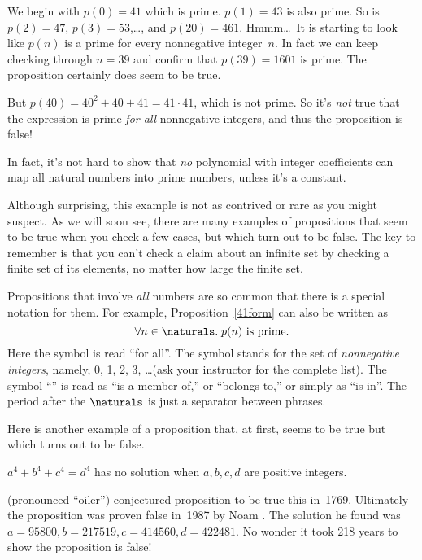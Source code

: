 We begin with $p(0) = 41$ which is prime.  $p(1) = 43$ is also prime.
So is $p(2) = 47$, $p(3)=53$,\dots, and $p(20) = 461$.  Hmmm\dots\ It
is starting to look like $p(n)$ is a prime for every nonnegative
integer~$n$.  In fact we can keep checking through $n=39$ and confirm
that $p(39)=1601$ is prime.  The proposition certainly does seem to be
true.

But $p(40) = 40^2 + 40 + 41 = 41 \cdot 41$, which is not prime.  So
it's \emph{not} true that the expression is prime \emph{for all}
nonnegative integers, and thus the proposition is false!

\begin{editingnotes}
In fact, it's not hard to show that \emph{no} polynomial
with integer coefficients can map all natural numbers into prime
numbers, unless it's a constant.
\end{editingnotes}

Although surprising, this example is not as contrived or rare as you
might suspect.  As we will soon see, there are many examples of
propositions that seem to be true when you check a few cases, but
which turn out to be false.  The key to remember is that you
can't check a claim about an infinite
set by checking a finite set of its elements, no matter how large the
finite set.

Propositions that involve \emph{all} numbers
are so common that there is a special notation for them.  For example,
Proposition~\ref{41form} can also be written as
\begin{equation}\label{pn}
\forall n \in \naturals.\; p(n) \text{ is prime}.
\end{equation}
Here the symbol \term{$\forall$} is read ``for all''.  The symbol
\term{$\naturals$} stands for the set of {\em nonnegative integers},
namely, 0, 1, 2, 3, \dots (ask your instructor for the complete list).
The symbol ``\term{$\in$}'' is read as ``is a member of,'' or
``belongs to,'' or simply as ``is in''.  The period after the
$\naturals$ is just a separator between phrases.

\iffalse
\begin{notesproblem}
Show that no nonconstant polynomial can map all nonnegative integers into
prime numbers.  (This can be proved using elementary algebra, but it's a
little tricky.  It will be easier to show after we study modular
arithmetic later in the term.)
\end{notesproblem}
\fi

Here is another example of a proposition that, at first, seems to be
true but which turns out to be false.
\begin{proposition}\label{a4}
$a^4 + b^4 + c^4 = d^4$ has no solution when $a, b, c, d$ are positive
integers.
\end{proposition}
 (pronounced ``oiler'') conjectured proposition to be true
this in~1769.  Ultimately the proposition
was proven false in~1987 by Noam .  The solution he found
was $a = 95800, b = 217519, c = 414560, d = 422481$.  No wonder it
took 218 years to show the proposition is false!

